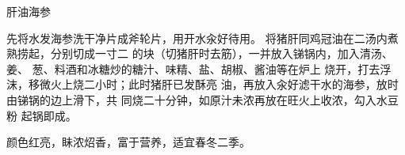 \begin{recipe}{肝油海参}

\ingredients



\cooking

\step 先将水发海参洗干净片成斧轮片，用开水汆好待用。 将猪肝同鸡冠油在二汤内煮熟捞起，分别切成一寸二 的块（切猪肝时去筋），一并放入锑锅内，加入清汤、姜、 葱、料酒和冰糖炒的糖汁、味精、盐、胡椒、酱油等在炉上 烧开，打去浮沫，移微火上烧二小时；此时猪肝已发酥亮 油，再放入汆好滤干水的海参，放时由锑锅的边上滑下，共 同烧二十分钟，如原汁未浓再放在旺火上收浓，勾入水豆粉 起锅即成。

\notes

颜色红亮，眛浓炤香，富于营养，适宜春冬二季。

\end{recipe}

